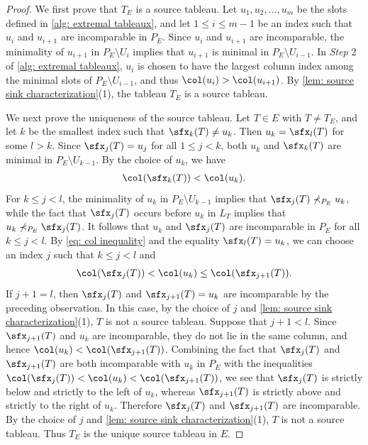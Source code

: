 \documentclass[12pt, reqno]{amsart}
\numberwithin{equation}{section}
\numberwithin{figure}{section}
\numberwithin{table}{section}
\theoremstyle{definition}
\begin{document}
\begin{proof}
We first prove that $T_E$ is a source tableau.
Let $u_1,u_2,\ldots,u_m$ be the slots defined in \cref{alg: extremal tableaux}, and let $1 \le i \le m-1$ be an index such that $u_i$ and $u_{i+1}$ are incomparable in $P_E$.
Since $u_i$ and $u_{i+1}$ are incomparable, the minimality of $u_{i+1}$ in $P_E \setminus U_i$ implies that $u_{i+1}$ is minimal in $P_E \setminus U_{i-1}$.
In \textit{Step} 2 of \cref{alg: extremal tableaux}, $u_i$ is chosen to have the largest column index among the minimal slots of $P_E \setminus U_{i-1}$, and thus $\col(u_i)>\col(u_{i+1})$.
By \cref{lem: source sink characterization}(1), the tableau $T_E$ is a source tableau.

We next prove the uniqueness of the source tableau.
Let $T \in E$ with $T\ne T_E$, and let $k$ be the smallest index such that $\sfx_k(T)\ne u_k$.
Then $u_k=\sfx_l(T)$ for some $l>k$.
Since $\sfx_j(T)=u_j$ for all $1 \le j<k$, both $u_k$ and $\sfx_k(T)$ are minimal in $P_E \setminus U_{k-1}$.
By the choice of $u_k$, we have
\begin{align}\label{eq: col inequality}
\col(\sfx_k(T)) < \col(u_k).
\end{align}
For $k\le j<l$, the minimality of $u_k$ in $P_E \setminus U_{k-1}$ implies that $\sfx_j(T) \nprec_{P_E} u_k$, while the fact that $\sfx_j(T)$ occurs before $u_k$ in $L_T$ implies that $u_k \nprec_{P_E} \sfx_j(T)$.
It follows that $u_k$ and $\sfx_j(T)$ are incomparable in $P_E$ for all $k\le j<l$.
By \cref{eq: col inequality} and the equality $\sfx_l(T)=u_k$, we can choose an index $j$ such that $k\le j<l$ and
\[
\col(\sfx_j(T))<\col(u_k)\le\col(\sfx_{j+1}(T)).
\]
If $j+1=l$, then $\sfx_j(T)$ and $\sfx_{j+1}(T)=u_k$ are incomparable by the preceding observation.
In this case, by the choice of $j$ and \cref{lem: source sink characterization}(1), $T$ is not a source tableau.
Suppose that $j+1<l$.
Since $\sfx_{j+1}(T)$ and $u_k$ are incomparable, they do not lie in the same column, and hence $\col(u_k)<\col(\sfx_{j+1}(T))$.
Combining the fact that $\sfx_j(T)$ and $\sfx_{j+1}(T)$ are both incomparable with $u_k$ in $P_E$ with the inequalities $\col(\sfx_j(T))<\col(u_k)<\col(\sfx_{j+1}(T))$, we see that $\sfx_j(T)$ is strictly below and strictly to the left of $u_k$, whereas $\sfx_{j+1}(T)$ is strictly above and strictly to the right of $u_k$.
Therefore $\sfx_j(T)$ and $\sfx_{j+1}(T)$ are incomparable.
By the choice of $j$ and \cref{lem: source sink characterization}(1), $T$ is not a source tableau.
Thus $T_E$ is the unique source tableau in $E$.


\end{proof}
\end{document}

